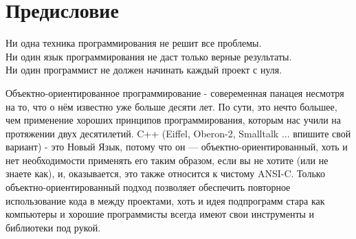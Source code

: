 \documentclass[a4paper,12pt]{book}
\begin{document}
\frontmatter

\chapterfont{\raggedleft}
\chapter{Предисловие}

{
\begin{comment}
No programming technique solves all problems.
No programming language produces only correct results.
No programmer should start each project from scratch.
\end{comment}

\raggedleft
Ни одна техника программирования не решит все проблемы.\\
Ни один язык программирования не даст только верные результаты.\\
Ни один программист не должен начинать каждый проект с нуля.\\
}
\bigskip
{
\begin{comment}
Object-oriented programming is the current cure-all — although it has been
around for much more then ten years. At the core, there is little more to it then
finally applying the good programming principles which we have been taught for
more then twenty years. C++ (Eiffel, Oberon-2, Smalltalk ... take your pick) is the
New Language because it is object-oriented — although you need not use it that
way if you do not want to (or know how to), and it turns out that you can do just as
well with plain ANSI-C. Only object-orientation permits code reuse between projects
— although the idea of subroutines is as old as computers and good programmers
always carried their toolkits and libraries with them.
\end{comment}
Объектно-ориентированное программирование - совеременная панацея несмотря на то, 
что о нём известно уже больше десяти лет. По сути, это нечто большее, чем 
применение хороших принципов программирования, которым нас учили 
на протяжении двух десятилетий. \mbox{C++} (\mbox{Eiffel,} \mbox{Oberon-2,} \mbox{Smalltalk} ... впишите свой вариант) - это 
Новый Язык, потому что он --- объектно-ориентированный, хоть и нет необходимости применять его таким 
образом, если вы не хотите (или не знаете как), и, оказывается, это также относится к чистому ANSI-C. Только объектно-ориентированный подход позволяет обеспечить повторное использование кода в между проектами, 
хоть и идея подпрограмм стара как компьютеры и хорошие программисты 
всегда имеют свои инструменты и библиотеки под рукой.
}
\end{document}
